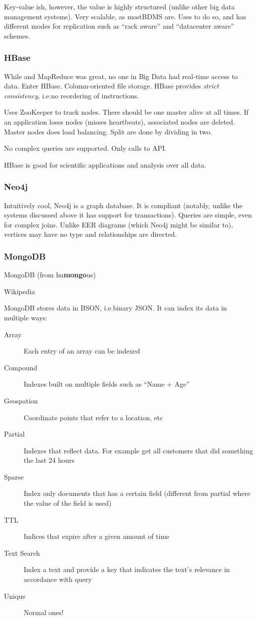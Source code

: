 Key-value ish, however, the value is highly structured (unlike other big data
management systems).  Very scalable, as mostBDMS are.
Uses  to do so, and has different modes for replication
such as ``rack aware'' and ``datacenter aware'' schemes.

\subsubsection{HBase}\label{sec:HBase}
While  and MapReduce was great, no one in Big Data
had real-time access to data. Enter HBase. Column-oriented file storage.
HBase provides \textit{strict consistency}, i.e.\@ no reordering of instructions.

Uses ZooKeeper to track nodes. There should be one master alive at all times.
If an application loses nodes (misses heartbeats), associated nodes are deleted.
Master nodes does load balancing.  Split are done by dividing in two.

No complex queries are supported. Only calls to API. 

HBase is good for scientific applications and analysis over all data.

\subsubsection{Neo4j}\label{sec:neo4j}
Intuitively cool, Neo4j is a graph database. It is  compliant (notably, unlike the systems discussed above it has support for transactions).
Queries are simple, even for complex joins. Unlike EER diagrams (which Neo4j might be
similar to), vertices may have no type and relationships are directed.


\subsubsection{MongoDB}\label{sec:mongodb}
\epigraph{MongoDB (from hu\textbf{mongo}us)}{Wikipedia}

MongoDB stores data in BSON, i.e.\@ binary JSON. It can index its data in multiple ways:
\begin{description}
    \item[Array] Each entry of an array can be indexed
    \item[Compound] Indexes built on multiple fields such as ``Name  + Age''
    \item[Geospation] Coordinate points that refer to a location, etc
    \item[Partial] Indexes that reflect data. For example get all customers that did something the last 24 hours
    \item[Sparse] Index only documents that has a certain field (different from partial where the value of the field is used)
    \item[TTL] Indices that expire after a given amount of time
    \item[Text Search] Index a text and provide a key that indicates the text's relevance in accordance with query
    \item[Unique] Normal ones!
\end{description}

